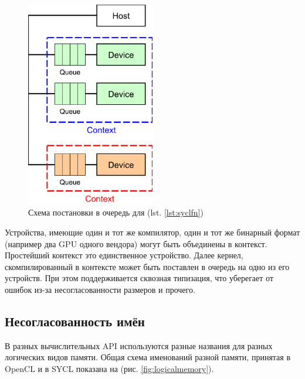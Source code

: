 \documentclass[a4paper,12pt,oneside]{article}
\begin{document}
\begin{figure}
\centering
\includegraphics[width=0.5\textwidth]{pictures/hetero-prog-queue.pdf}
\caption{Схема постановки в очередь для (lst. \ref{lst:syclfn})}
\label{fig:syclfn}
\end{figure}

Устройства, имеющие один и тот же компилятор, один и тот же бинарный формат (например два GPU одного вендора) могут быть объединены в контекст. Простейший контекст это единственное устройство. Далее кернел, скомпилированный в контексте может быть поставлен в очередь на одно из его устройств.
При этом поддерживается сквозная типизация, что уберегает от ошибок из-за несогласованности размеров и прочего.

\subsection{Несогласованность имён}\label{subsec:names}

В разных вычислительных API используются разные названия для разных логических видов памяти. Общая схема именований разной памяти, принятая в OpenCL и в SYCL показана на (рис. \ref{fig:logicalmemory}).
\end{document}
